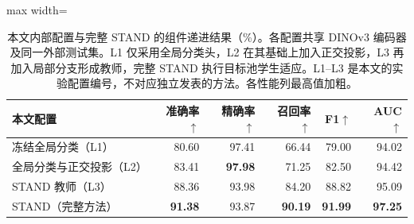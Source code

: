 \begin{table}[htbp]
\centering\small
\caption{本文内部配置与完整 STAND 的组件递进结果（\%）。各配置共享 DINOv3 编码器及同一外部测试集。L1 仅采用全局分类头，L2 在其基础上加入正交投影，L3 再加入局部分支形成教师，完整 STAND 执行目标池学生适应。L1--L3 是本文的实验配置编号，不对应独立发表的方法。各性能列最高值加粗。}
\label{tab:ladder}
\begin{adjustbox}{max width=\linewidth}
\begin{tabular}{lrrrrr}
\toprule
本文配置 & 准确率$\uparrow$ & 精确率$\uparrow$ & 召回率$\uparrow$ & F1$\uparrow$ & AUC$\uparrow$\\
\midrule
冻结全局分类（L1） & 80.60 & 97.41 & 66.44 & 79.00 & 94.02\\
全局分类与正交投影（L2） & 83.41 & \textbf{97.98} & 71.25 & 82.50 & 94.42\\
STAND 教师（L3） & 88.36 & 93.98 & 84.20 & 88.82 & 95.09\\
STAND（完整方法） & \textbf{91.38} & 93.87 & \textbf{90.19} & \textbf{91.99} & \textbf{97.25}\\
\bottomrule
\end{tabular}
\end{adjustbox}
\end{table}
